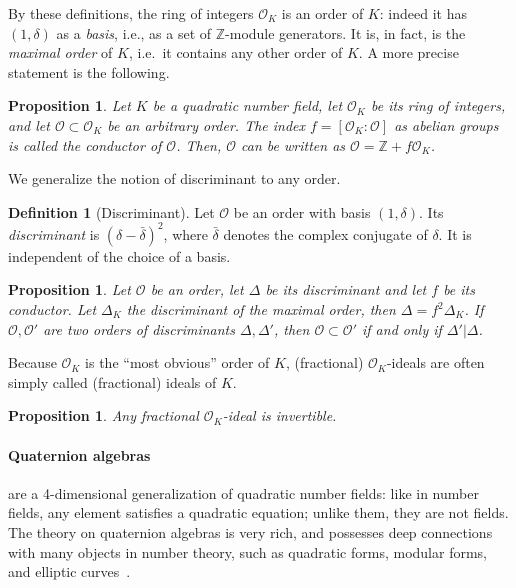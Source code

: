 \documentclass[10pt]{article}
\theoremstyle{plain}
\newtheorem{proposition}[theorem]{Proposition}
\theoremstyle{definition}
\newtheorem{definition}[theorem]{Definition}
\def\O{\ensuremath{\mathcal{O}}}
\begin{document}
By these definitions, the ring of integers $\O_K$ is an order of $K$:
indeed it has $(1,δ)$ as a \emph{basis}, i.e., as a set of $ℤ$-module
generators. %
It is, in fact, is the \emph{maximal order} of $K$, i.e.\ it contains
any other order of $K$. %
A more precise statement is the following.

\begin{proposition}
  Let $K$ be a quadratic number field, let $\O_K$ be its ring of
  integers, and let $\O ⊂ \O_K$ be an arbitrary order. %
  The index $f=[\O_K:\O]$ as abelian groups is called the
  \emph{conductor of $\O$}. %
  Then, $\O$ can be written as $\O=ℤ+f\O_K$. %
\end{proposition}  

We generalize the notion of discriminant to any order.

\begin{definition}[Discriminant]
  Let $\O$ be an order with basis $(1,δ)$. %
  Its \emph{discriminant} is $(δ-\bar{δ})^2$, where
  $\bar{δ}$ denotes the complex conjugate of $δ$. %
  It is independent of the choice of a basis.
\end{definition}

\begin{proposition}
  Let $\O$ be an order, let $Δ$ be its discriminant and let $f$ be its
  conductor. %
  Let $Δ_K$ the discriminant of the maximal order, then
  $Δ = f^2Δ_K$. %
  If $\O,\O'$ are two orders of discriminants $Δ,Δ'$, then $\O⊂\O'$ if
  and only if $Δ'|Δ$.
\end{proposition}

Because $\O_K$ is the ``most obvious'' order of $K$, (fractional)
$\O_K$-ideals are often simply called (fractional) ideals of $K$. %

\begin{proposition}
  Any fractional $\O_K$-ideal is invertible.
\end{proposition}


\paragraph{Quaternion algebras} %
are a 4-dimensional generalization of quadratic number fields: like in
number fields, any element satisfies a quadratic equation; unlike
them, they are not fields. The theory on quaternion algebras is very rich,
and possesses deep connections with many objects in number theory, such as
quadratic forms, modular forms, and elliptic curves~\cite{Lam,Voight2018}.
\end{document}
